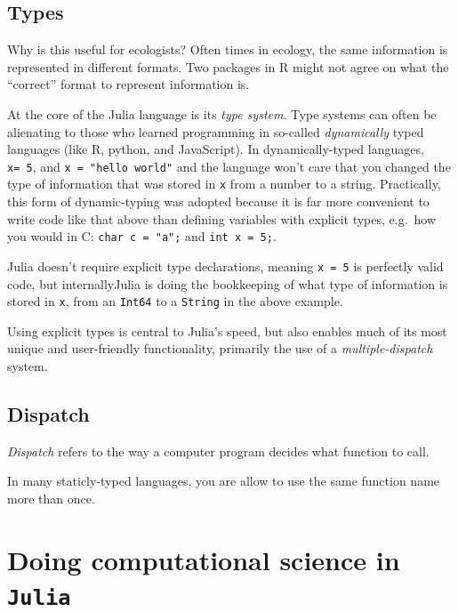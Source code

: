 \documentclass[11pt]{article}
\begin{document}
\hypertarget{types}{%
\subsection{Types}\label{types}}

Why is this useful for ecologists? Often times in ecology, the same
information is represented in different formats. Two packages in R might
not agree on what the ``correct'' format to represent information is.

At the core of the Julia language is its \emph{type system}. Type
systems can often be alienating to those who learned programming in
so-called \emph{dynamically} typed languages (like R, python, and
JavaScript). In dynamically-typed languages, \texttt{x=\ 5}, and
\texttt{x\ =\ "hello\ world"} and the language won't care that you
changed the type of information that was stored in \texttt{x} from a
number to a string. Practically, this form of dynamic-typing was adopted
because it is far more convenient to write code like that above than
defining variables with explicit types, e.g.~how you would in C:
\texttt{char\ c\ =\ "a";} and \texttt{int\ x\ =\ 5;}.

Julia doesn't require explicit type declarations, meaning
\texttt{x\ =\ 5} is perfectly valid code, but internallyJulia is doing
the bookkeeping of what type of information is stored in \texttt{x},
from an \texttt{Int64} to a \texttt{String} in the above example.

Using explicit types is central to Julia's speed, but also enables much
of its most unique and user-friendly functionality, primarily the use of
a \emph{multiple-dispatch} system.

\hypertarget{dispatch}{%
\subsection{Dispatch}\label{dispatch}}

\emph{Dispatch} refers to the way a computer program decides what
function to call.

In many staticly-typed languages, you are allow to use the same function
name more than once.

\hypertarget{doing-computational-science-in-julia}{%
\section{\texorpdfstring{Doing computational science in
\texttt{Julia}}{Doing computational science in Julia}}\label{doing-computational-science-in-julia}}
\end{document}
